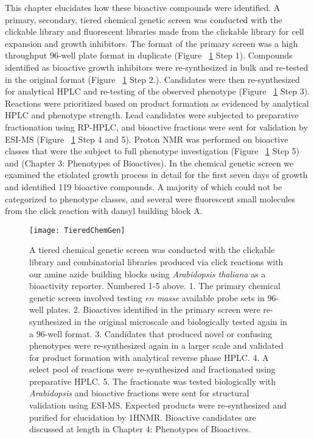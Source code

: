 This chapter elucidates how these bioactive compounds were identified. A primary, secondary, tiered chemical genetic screen was conducted with the clickable library and fluorescent libraries made from the clickable library for cell expansion and growth inhibitors. The format of the primary screen was a high throughput 96-well plate format in duplicate (Figure ~\ref{fig:TieredChemGen} Step 1). Compounds identified as bioactive growth inhibitors were re-synthesized in bulk and re-tested in the original format (Figure ~\ref{fig:TieredChemGen} Step 2.). Candidates were then re-synthesized for analytical HPLC and re-testing of the observed phenotype (Figure ~\ref{fig:TieredChemGen} Step 3). Reactions were prioritized based on product formation as evidenced by analytical HPLC and phenotype strength. Lead candidates were subjected to preparative fractionation using RP-HPLC, and bioactive fractions were sent for validation by ESI-MS (Figure ~\ref{fig:TieredChemGen} Step 4 and 5). Proton NMR was performed on bioactive classes that were the subject to full phenotype investigation (Figure ~\ref{fig:TieredChemGen} Step 5) and (Chapter 3: Phenotypes of Bioactives).  In the chemical genetic screen we examined the etiolated growth process in detail for the first seven days of growth and identified 119 bioactive compounds. A majority of which could not be categorized to phenotype classes, and several were fluorescent small molecules from the click reaction with dansyl building block A.

\clearpage
\begin{figure}
\centering
\texttt{[image: TieredChemGen]}
\caption{A tiered chemical genetic screen was conducted with the clickable library and combinatorial libraries produced via click reactions with our amine azide building blocks using {\it Arabidopsis thaliana} as a bioactivity reporter. Numbered 1-5 above. 1. The primary chemical genetic screen involved testing {\it en masse} available probe sets in 96-well plates. 2. Bioactives identified in the primary screen were re-synthesized in the original microscale and biologically tested again in a 96-well format. 3. Candidates that produced novel or confusing phenotypes were re-synthesized again in a larger scale and validated for product formation with analytical reverse phase HPLC. 4. A select pool of reactions were re-synthesized and fractionated using preparative HPLC. 5. The fractionate was tested biologically with {\it Arabidopsis} and bioactive fractions were sent for structural validation using ESI-MS. Expected products were re-synthesized and purified for elucidation by 1HNMR. Bioactive candidates are discussed at length in Chapter 4: Phenotypes of Bioactives.}
\label{fig:TieredChemGen}
\end{figure}

